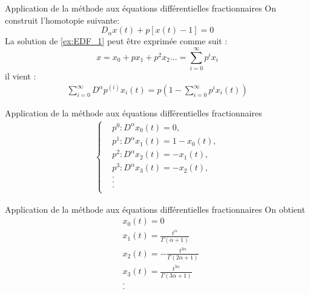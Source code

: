 \documentclass{sintefbeamer}
\begin{document}
\begin{frame}{Application de la méthode aux équations différentielles fractionnaires}
    On construit l'homotopie suivante:
\begin{equation} \label{eq:HPM_EDF2}
    D_{\alpha} x(t) +p\left[x(t)-1\right]=0
\end{equation}
La solution de \ref{ex:EDF_1} peut être exprimée comme suit :
\begin{equation}\label{sol:EDF_2}
    x=x_0 + px_1 + p^2x_2 ... = \sum _{i=0}^{\infty} p^i x_i
\end{equation}
il vient :
\begin{align*}
    \sum_{i=0}^{\infty} D^{\alpha} p^{(i)}x_i(t) = p\left(1-\sum_{i=0}^{\infty} p^{i}x_i (t) \right)
\end{align*}
\end{frame}

\begin{frame}{Application de la méthode aux équations différentielles fractionnaires}
    \begin{align}\label{eq:p_2}
\begin{cases}
    & p^0 : D^{\alpha}x_0(t)=0, \\
    & p^1 : D^{\alpha}x_1(t) = 1 -x_0(t),\\
    & p^2 : D^{\alpha} x_2(t) = -x_1(t),\\
    & p^3 : D^{\alpha} x_3(t) = -x_2(t),\\
    &     . \\
    &     .\\
    &     .\\
\end{cases}
\end{align}
\end{frame}

\begin{frame}{Application de la méthode aux équations différentielles fractionnaires}
    On obtient 
    \begin{align*}
    & x_0(t) = 0\\
    & x_1(t) = \frac{t^{\alpha}}{\Gamma(\alpha +1)}\\
    & x_2(t) = -\frac{t^{2\alpha}}{\Gamma(2\alpha +1)}\\
    & x_3(t) = \frac{t^{3\alpha}}{\Gamma(3\alpha+1)}\\
    & . \\
    & . \\
\end{align*}
\end{frame}
\end{document}
